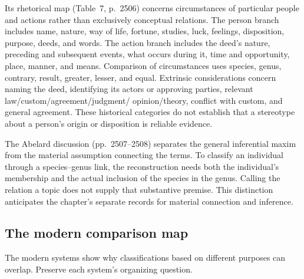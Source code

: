 Its rhetorical map (Table~7, p.~2506) concerns circumstances of
particular people and actions rather than exclusively conceptual
relations. The person branch includes name, nature, way of life,
fortune, studies, luck, feelings, disposition, purpose, deeds, and words.
The action branch includes the deed's nature, preceding and subsequent
events, what occurs during it, time and opportunity, place, manner,
and means. Comparison of circumstances uses species, genus,
contrary, result, greater, lesser, and equal.
Extrinsic considerations concern naming the deed, identifying its
actors or approving parties, relevant law/custom/agreement/judgment/
opinion/theory, conflict with custom, and general agreement.
These historical categories do not establish that a stereotype about
a person's origin or disposition is reliable evidence.

The Abelard discussion (pp.~2507--2508) separates the general
inferential maxim from the material assumption connecting the terms.
To classify an individual through a species--genus link, the
reconstruction needs both the individual's membership and the actual
inclusion of the species in the genus. Calling the relation a topic
does not supply that substantive premise. This distinction anticipates
the chapter's separate records for material connection and inference.

\subsection{The modern comparison map}

The modern systems show why classifications based on different purposes
can overlap. Preserve each system's organizing question.

